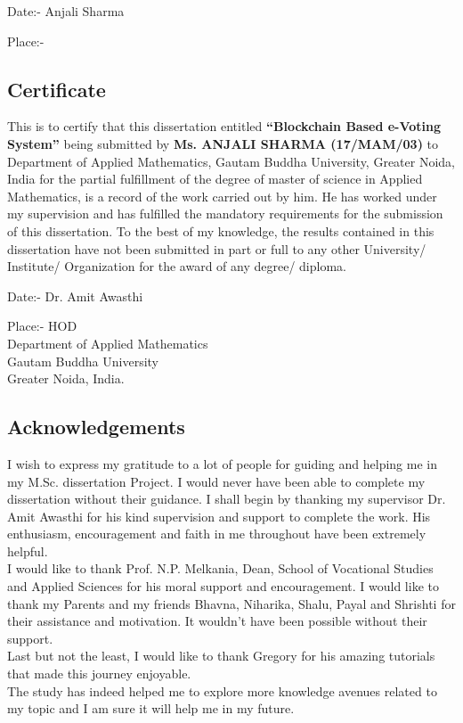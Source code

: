 \documentclass{report}
\begin{document}
 \vspace{1.0in}
 
 Date:- \hfill Anjali Sharma 
 
 \vspace{0.1in}
 Place:- 

 
\newpage
 \begin{center}
\section*{Certificate}
 \end{center}
This is to certify that this dissertation entitled \textbf{“Blockchain Based e-Voting System”} being submitted by \textbf{Ms. ANJALI SHARMA (17/MAM/03)} to Department of Applied Mathematics, Gautam Buddha University, Greater Noida, India for the partial fulfillment of the degree of master of science in Applied Mathematics, is a record of the work carried out by him. He has worked under my supervision and has fulfilled the mandatory requirements for the submission of this dissertation. To the best of my knowledge, the results contained in this dissertation have not been submitted in part or full to any other University/ Institute/ Organization for the award of any degree/ diploma. 

 \vspace{1.0in}
 
 Date:- \hfill Dr. Amit Awasthi
 
 \vspace{0.1in}
 Place:- \hfill HOD\\
 \null \hfill Department of Applied Mathematics\\
\null \hfill Gautam Buddha University\\
\null \hfill Greater Noida, India.


 \newpage
 \begin{center}
\section*{Acknowledgements}
 \end{center}
I wish to express my gratitude to a lot of people for guiding and helping me in my M.Sc. dissertation Project. I would never have been able to complete my dissertation without their guidance. I shall begin by thanking my supervisor Dr. Amit Awasthi for his kind supervision and support to complete the work. His enthusiasm, encouragement and faith in me throughout have been extremely helpful.\\
I would like to thank Prof. N.P. Melkania, Dean, School of Vocational Studies and Applied Sciences for his moral support and encouragement. 
 I would like to thank my Parents and my friends Bhavna, Niharika, Shalu, Payal and Shrishti for their assistance and motivation. It wouldn’t have been possible without their support. \\
Last but not the least, I would like to thank Gregory for his amazing tutorials that made this journey enjoyable.
\\
The study has indeed helped me to explore more knowledge avenues related to my topic and I am sure it will help me in my future.
\end{document}
